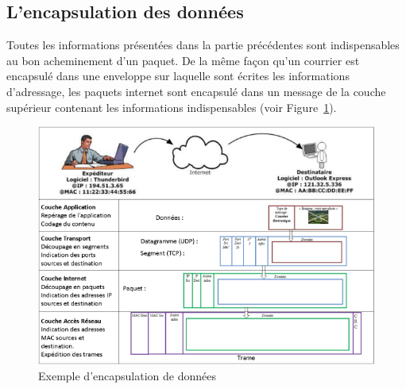\documentclass[10pt,fleqn]{article} %
\begin{document}
\subsection{L'encapsulation des données}
Toutes les informations présentées dans la partie précédentes sont indispensables au bon acheminement d'un paquet. De la même façon qu'un courrier est encapsulé dans une enveloppe sur laquelle sont écrites les informations d'adressage, les paquets internet sont encapsulé dans un message de la couche supérieur contenant les informations indispensables (voir Figure~\ref{fig:res_encapsulation}).

\begin{figure}[h]
  \centering
  \includegraphics[width=.7\textwidth]{img/reseau_encapsulation}
  \caption{Exemple d'encapsulation de données}
  \label{fig:res_encapsulation}
\end{figure}
\end{document}
